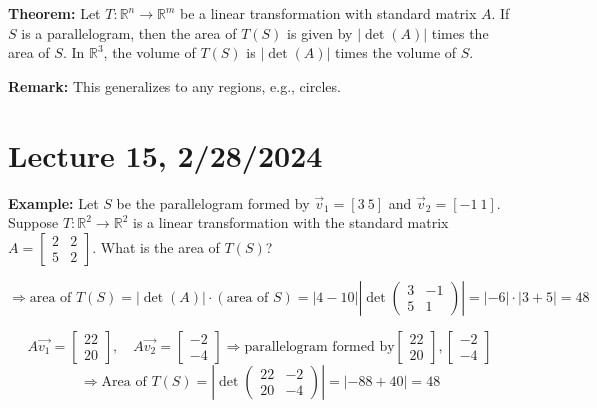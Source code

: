 \documentclass{article}
\begin{document}
\textbf{Theorem:} Let \( T : \mathbb{R}^n \rightarrow \mathbb{R}^m \) be a linear transformation with standard matrix \( A \). If \( S \) is a parallelogram, then the area of \( T(S) \) is given by \( \left| \det(A) \right| \) times the area of \( S \). In \( \mathbb{R}^3 \), the volume of \( T(S) \) is \( \left| \det(A) \right| \) times the volume of \( S \).

\textbf{Remark:} This generalizes to any regions, e.g., circles.



\section{Lecture 15, 2/28/2024}

\textbf{Example:} Let \( S \) be the parallelogram formed by \( \vec{v}_1 = [3\ 5] \) and \( \vec{v}_2 = [-1\ 1] \). Suppose \( T : \mathbb{R}^2 \rightarrow \mathbb{R}^2 \) is a linear transformation with the standard matrix \( A = \begin{bmatrix} 2 & 2 \\ 5 & 2 \end{bmatrix} \). What is the area of \( T(S) \)?

\[
\Rightarrow \text{area of } T(S) = \left| \det(A) \right| \cdot (\text{area of } S) = \left| 4-10 \right| \left| \det \begin{pmatrix} 3 & -1 \\ 5 & 1 \end{pmatrix} \right| = \left| -6 \right| \cdot \left| 3+5 \right| = 48
\]

\[
A\vec{v_1} = \begin{bmatrix} 22 \\ 20 \end{bmatrix}, \quad A\vec{v_2} = \begin{bmatrix} -2 \\ -4 \end{bmatrix} \Rightarrow \text{parallelogram formed by} \begin{bmatrix} 22 \\ 20 \end{bmatrix}, \begin{bmatrix} -2 \\ -4 \end{bmatrix} 
\]
\[
\Rightarrow \text{Area of } T(S) = \left| \det \begin{pmatrix} 22 & -2 \\ 20 & -4 \end{pmatrix} \right| = \left| -88 + 40 \right| = 48
\]
\end{document}
